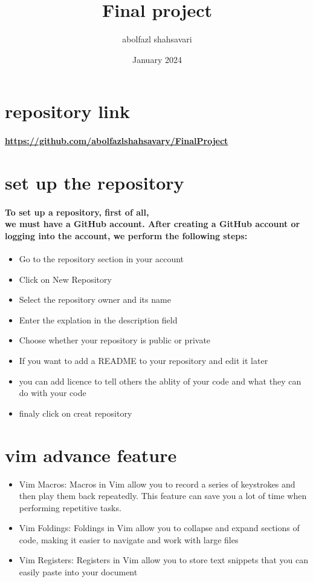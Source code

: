 \documentclass[12pt]{article}
\title{Final project}
\author{abolfazl shahsavari}
\date{January 2024}
\begin{document}
\maketitle
\newpage
\tableofcontents
\newpage

\section{repository link}
\paragraph{\url{https://github.com/abolfazlshahsavary/FinalProject}}
\section{set up the repository}
\paragraph{To set up a repository, first of all,\\ we must have a GitHub account. After creating a GitHub account or \\logging into the account, we perform the following steps:}

\begin{itemize}
    \item Go to the repository section in your account
    \item Click on New Repository
    \item Select the repository owner and its name
    \item Enter the explation in the description field
    \item Choose whether your repository is public or private
    \item If you want to add a README to your repository and edit it later
    \item you can add licence to tell others the ablity of your code and what they can do with your code
    \item finaly click on creat repository 
\end{itemize}
\section{vim advance feature}
\begin{itemize}
    \item Vim Macros: Macros in Vim allow you to record a series of keystrokes and \\then play them back repeatedly. This feature can save you a lot of time when\\ performing repetitive tasks.  
    \item Vim Foldings: Foldings in Vim allow you to collapse and expand sections of code, making it easier to navigate and work with large files
    \item  Vim Registers: Registers in Vim allow you to store text snippets that you can easily paste into your document

\end{itemize}
\end{document}
